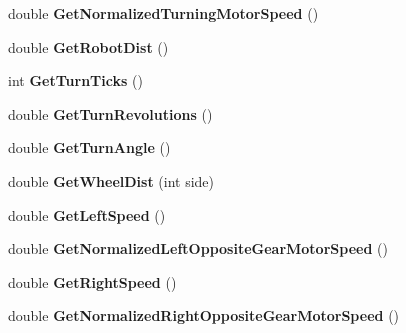 \begin{DoxyCompactItemize}
\item 
\hypertarget{class_drive_encoders_ac3325e2d842fa7d84dcc273925898497}{
double {\bfseries \-Get\-Normalized\-Turning\-Motor\-Speed} ()}
\label{class_drive_encoders_ac3325e2d842fa7d84dcc273925898497}

\item 
\hypertarget{class_drive_encoders_a29be919afe11a8887ff1c9fe4f9b791f}{
double {\bfseries \-Get\-Robot\-Dist} ()}
\label{class_drive_encoders_a29be919afe11a8887ff1c9fe4f9b791f}

\item 
\hypertarget{class_drive_encoders_aa656031072b3159391365e193ec87763}{
int {\bfseries \-Get\-Turn\-Ticks} ()}
\label{class_drive_encoders_aa656031072b3159391365e193ec87763}

\item 
\hypertarget{class_drive_encoders_a566b245db06b97d912ad3ce7d008202b}{
double {\bfseries \-Get\-Turn\-Revolutions} ()}
\label{class_drive_encoders_a566b245db06b97d912ad3ce7d008202b}

\item 
\hypertarget{class_drive_encoders_a0ccec7f145a82105b48a45ee9f30172b}{
double {\bfseries \-Get\-Turn\-Angle} ()}
\label{class_drive_encoders_a0ccec7f145a82105b48a45ee9f30172b}

\item 
\hypertarget{class_drive_encoders_a36ed310f6309267984032ce99d980a99}{
double {\bfseries \-Get\-Wheel\-Dist} (int side)}
\label{class_drive_encoders_a36ed310f6309267984032ce99d980a99}

\item 
\hypertarget{class_drive_encoders_a2042134cf81e0f7412e79c6bc8e30c2c}{
double {\bfseries \-Get\-Left\-Speed} ()}
\label{class_drive_encoders_a2042134cf81e0f7412e79c6bc8e30c2c}

\item 
\hypertarget{class_drive_encoders_a4e32e5ae07deec9323af7c77966c9bef}{
double {\bfseries \-Get\-Normalized\-Left\-Opposite\-Gear\-Motor\-Speed} ()}
\label{class_drive_encoders_a4e32e5ae07deec9323af7c77966c9bef}

\item 
\hypertarget{class_drive_encoders_a796cad5fb976d90f315dd4e86170721d}{
double {\bfseries \-Get\-Right\-Speed} ()}
\label{class_drive_encoders_a796cad5fb976d90f315dd4e86170721d}

\item 
\hypertarget{class_drive_encoders_a016534596920180d626e27c089c90c2d}{
double {\bfseries \-Get\-Normalized\-Right\-Opposite\-Gear\-Motor\-Speed} ()}
\label{class_drive_encoders_a016534596920180d626e27c089c90c2d}


\end{DoxyCompactItemize}
